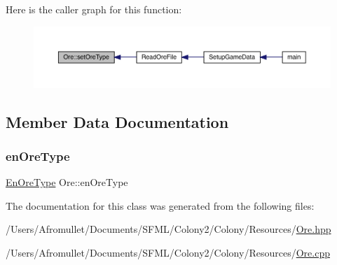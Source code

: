 Here is the caller graph for this function\+:
\nopagebreak
\begin{figure}[H]
\begin{center}
\leavevmode
\includegraphics[width=350pt]{class_ore_a7d463e3c3da27da5a4e645c8ea062251_icgraph}
\end{center}
\end{figure}


\subsection{Member Data Documentation}
\mbox{\label{class_ore_a834b6f726ecb7ce8e0904fd58f551a16}} 
\subsubsection{\texorpdfstring{en\+Ore\+Type}{enOreType}}
{\footnotesize\ttfamily \mbox{\hyperlink{_ore_8hpp_a4dd6f8b19eecee73049dd69be5803f14}{En\+Ore\+Type}} Ore\+::en\+Ore\+Type\hspace{0.3cm}{\ttfamily [private]}}



The documentation for this class was generated from the following files\+:\begin{DoxyCompactItemize}
\item 
/\+Users/\+Afromullet/\+Documents/\+S\+F\+M\+L/\+Colony2/\+Colony/\+Resources/\mbox{\hyperlink{_ore_8hpp}{Ore.\+hpp}}\item 
/\+Users/\+Afromullet/\+Documents/\+S\+F\+M\+L/\+Colony2/\+Colony/\+Resources/\mbox{\hyperlink{_ore_8cpp}{Ore.\+cpp}}\end{DoxyCompactItemize}
